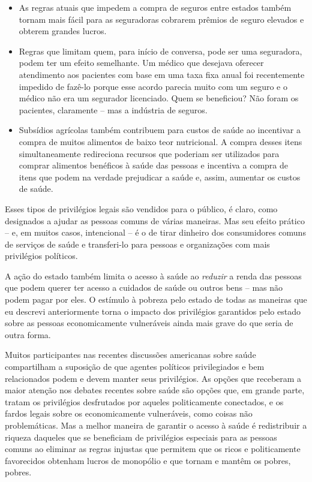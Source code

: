 \begin{itemize}
\item As regras atuais que impedem a compra de seguros entre estados também tornam mais fácil para as seguradoras cobrarem prêmios de seguro elevados e obterem grandes lucros.

\item Regras que limitam quem, para início de conversa, pode ser uma seguradora, podem ter um efeito semelhante. Um médico que desejava oferecer atendimento aos pacientes com base em uma taxa fixa anual foi recentemente impedido de fazê-lo porque esse acordo parecia muito com um seguro e o médico não era um segurador licenciado. Quem se beneficiou? Não foram os pacientes, claramente -- mas a indústria de seguros.

\item Subsídios agrícolas também contribuem para custos de saúde ao incentivar a compra de muitos alimentos de baixo teor nutricional. A compra desses itens simultaneamente redireciona recursos que poderiam ser utilizados para comprar alimentos benéficos à saúde das pessoas e incentiva a compra de itens que podem na verdade prejudicar a saúde e, assim, aumentar os custos de saúde.
\end{itemize}

Esses tipos de privilégios legais são vendidos para o público, é claro, como designados a ajudar as pessoas comuns de várias maneiras. Mas seu efeito prático -- e, em muitos casos, intencional -- é o de tirar dinheiro dos consumidores comuns de serviços de saúde e transferi-lo para pessoas e organizações com mais privilégios políticos.

A ação do estado também limita o acesso à saúde ao \emph{reduzir} a renda das pessoas que podem querer ter acesso a cuidados de saúde ou outros bens -- mas não podem pagar por eles. O estímulo à pobreza pelo estado de todas as maneiras que eu descrevi anteriormente torna o impacto dos privilégios garantidos pelo estado sobre as pessoas economicamente vulneráveis ainda mais grave do que seria de outra forma.

Muitos participantes nas recentes discussões americanas sobre saúde compartilham a suposição de que agentes políticos privilegiados e bem relacionados podem e devem manter seus privilégios. As opções que receberam a maior atenção nos debates recentes sobre saúde são opções que, em grande parte, tratam os privilégios desfrutados por aqueles politicamente conectados, e os fardos legais sobre os economicamente vulneráveis, como coisas não problemáticas. Mas a melhor maneira de garantir o acesso à saúde é redistribuir a riqueza daqueles que se beneficiam de privilégios especiais para as pessoas comuns ao eliminar as regras injustas que permitem que os ricos e politicamente favorecidos obtenham lucros de monopólio e que tornam e mantêm os pobres, pobres.

